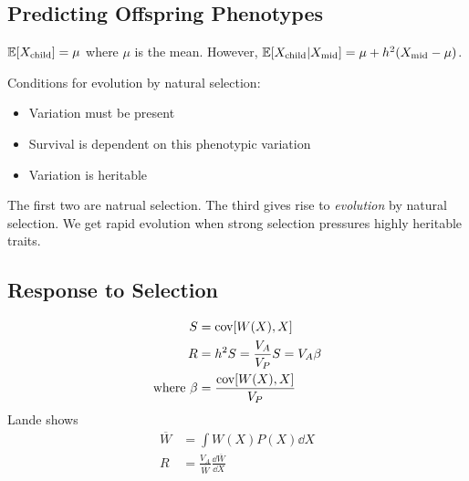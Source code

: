 \documentclass{article}
\newcommand{\expec}[1]{\mathbb{E}\qty[#1]}
\newcommand{\cov}[1]{\text{cov}\qty[#1]}
\begin{document}
        \subsection{Predicting Offspring Phenotypes}
            $\expec{X_\text{child}} = \mu$ where $\mu$ is the mean.  However, $\expec{X_\text{child}|X_\text{mid}} = \mu + h^2\qty(X_\text{mid} - \mu)$.

            Conditions for evolution by natural selection:
            \begin{itemize}
                \item Variation must be present
                \item Survival is dependent on this phenotypic variation
                \item Variation is heritable
            \end{itemize}
            The first two are natrual selection.  The third gives rise to \emph{evolution} by natural selection.  We get rapid evolution when strong selection pressures highly heritable traits.

        \subsection{Response to Selection}
            \begin{align}
                S &= \cov{W(X),X} \\
                R &= h^2S = \frac{V_A}{V_P}S = V_A\beta \\
                \text{where } \beta &= \frac{\cov{W(X),X}}{V_P}
            \end{align}
            Lande shows
            \begin{align}
                \overline{W} &= \int W(X)P(X)\dd X \\
                R &= \frac{V_A}{\overline{W}}\frac{\dd\overline{W}}{\dd X}
            \end{align}
\end{document}
